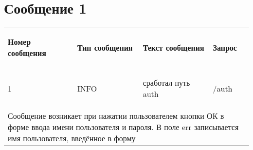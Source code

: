 \def\errnumber{1}%
\def\errtype{INFO}%
\def\errmessage{сработал путь auth}%
\def\errrequest{/auth}%
\def\errtext{Сообщение возникает при нажатии пользователем кнопки ОК в форме ввода имени пользователя и пароля. В поле err записывается имя пользователя, введённое в форму}

\section{Сообщение \errnumber}
\begin{tabular}{|p{3cm}||p{4cm}||p{4cm}||p{4cm}|}
	\hline 
	\begin{center}\textbf{Номер сообщения}\end{center}&\begin{center}\textbf{Тип сообщения}\end{center} &\begin{center}\textbf{Текст сообщения}\end{center} & \begin{center}\textbf{Запрос}\end{center} \\

	\begin{center}\errnumber\end{center}&\begin{center}\errtype\end{center} &\begin{center}\errmessage\end{center} & \begin{center}\errrequest\end{center} \\
	\hline
	 
	\multicolumn{4}{|p{16.5cm}|}{\errtext} \\
	\hline

\end{tabular} 
